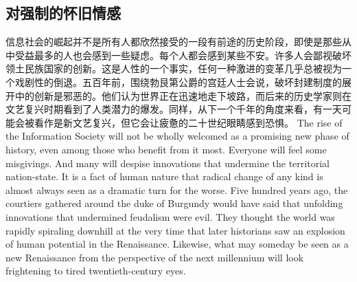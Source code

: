 \subsection{对强制的怀旧情感}
\begin{paracol}{2}[]
信息社会的崛起并不是所有人都欣然接受的一段有前途的历史阶段，即使是那些从中受益最多的人也会感到一些疑虑。每个人都会感到某些不安。许多人会鄙视破坏领土民族国家的创新。这是人性的一个事实，任何一种激进的变革几乎总被视为一个戏剧性的倒退。五百年前，围绕勃艮第公爵的宫廷人士会说，破坏封建制度的展开中的创新是邪恶的。他们认为世界正在迅速地走下坡路，而后来的历史学家则在文艺复兴时期看到了人类潜力的爆发。同样，从下一个千年的角度来看，有一天可能会被看作是新文艺复兴，但它会让疲惫的二十世纪眼睛感到恐惧。
\switchcolumn
The rise of the Information Society will not be wholly welcomed as a promising new phase of history, even among those who benefit from it most. Everyone will feel some misgivings. And many will despise innovations that undermine the territorial nation-state. It is a fact of human nature that radical change of any kind is almost always seen as a dramatic turn for the worse. Five hundred years ago, the courtiers gathered around the duke of Burgundy would have said that unfolding innovations that undermined feudalism were evil. They thought the world was rapidly spiraling downhill at the very time that later historians saw an explosion of human potential in the Renaissance. Likewise, what may someday be seen as a new Renaissance from the perspective of the next millennium will look frightening to tired twentieth-century eyes.


\end{paracol}
